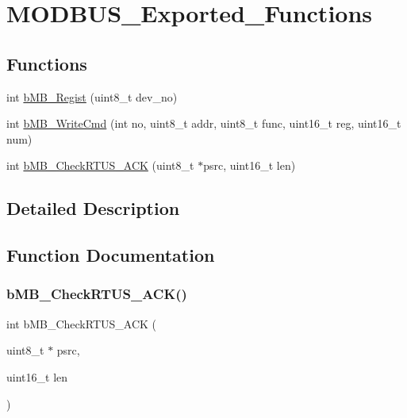 \hypertarget{group___m_o_d_b_u_s___exported___functions}{}\section{M\+O\+D\+B\+U\+S\+\_\+\+Exported\+\_\+\+Functions}
\label{group___m_o_d_b_u_s___exported___functions}
\subsection*{Functions}
\begin{DoxyCompactItemize}
\item 
int \mbox{\hyperlink{group___m_o_d_b_u_s___exported___functions_ga75fd562c121d4610608a1ab4053408da}{b\+M\+B\+\_\+\+Regist}} (uint8\+\_\+t dev\+\_\+no)
\item 
int \mbox{\hyperlink{group___m_o_d_b_u_s___exported___functions_gaec54fcf815442f741b8b3f008ea67239}{b\+M\+B\+\_\+\+Write\+Cmd}} (int no, uint8\+\_\+t addr, uint8\+\_\+t func, uint16\+\_\+t reg, uint16\+\_\+t num)
\item 
int \mbox{\hyperlink{group___m_o_d_b_u_s___exported___functions_ga9e0e2e9b8286a5db0ff6ef63885b8b2e}{b\+M\+B\+\_\+\+Check\+R\+T\+U\+S\+\_\+\+A\+CK}} (uint8\+\_\+t $\ast$psrc, uint16\+\_\+t len)
\end{DoxyCompactItemize}


\subsection{Detailed Description}


\subsection{Function Documentation}
\mbox{\label{group___m_o_d_b_u_s___exported___functions_ga9e0e2e9b8286a5db0ff6ef63885b8b2e}} 
\subsubsection{\texorpdfstring{b\+M\+B\+\_\+\+Check\+R\+T\+U\+S\+\_\+\+A\+C\+K()}{bMB\_CheckRTUS\_ACK()}}
{\footnotesize\ttfamily int b\+M\+B\+\_\+\+Check\+R\+T\+U\+S\+\_\+\+A\+CK (\begin{DoxyParamCaption}\item[{uint8\+\_\+t $\ast$}]{psrc,  }\item[{uint16\+\_\+t}]{len }\end{DoxyParamCaption})}

